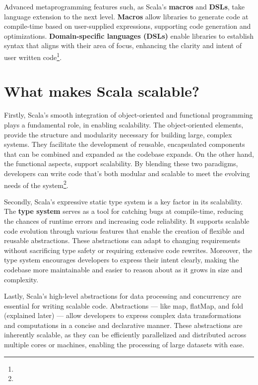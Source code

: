 Advanced metaprogramming features such, as Scala's \textbf{macros} and \textbf{DSLs}, take language extension to the next level. \textbf{Macros} allow libraries to generate code at compile-time based on user-supplied expressions, supporting code generation and optimizations. \textbf{Domain-specific languages (DSLs)} enable libraries to establish syntax that aligns with their area of focus, enhancing the clarity and intent of user written code\footnote[3]{}.

\section{What makes Scala scalable?}

Firstly, Scala's smooth integration of object-oriented and functional programming plays a fundamental role, in enabling scalability. The object-oriented elements, provide the structure and modularity necessary for building large, complex systems. They facilitate the development of reusable, encapsulated components that can be combined and expanded as the codebase expands. On the other hand, the functional aspects, support scalability. By blending these two paradigms, developers can write code that's both modular and scalable to meet the evolving needs of the system\footnote[2]{}.

Secondly, Scala's expressive static type system is a key factor in its scalability. The \textbf{type system} serves as a tool for catching bugs at compile-time, reducing the chances of runtime errors and increasing code reliability. It supports scalable code evolution through various features that enable the creation of flexible and reusable abstractions. These abstractions can adapt to changing requirements without sacrificing type safety or requiring extensive code rewrites. Moreover, the type system encourages developers to express their intent clearly, making the codebase more maintainable and easier to reason about as it grows in size and complexity\footnotemark[2].

Lastly, Scala's high-level abstractions for data processing and concurrency are essential for writing scalable code. Abstractions — like map, flatMap, and fold (explained later) — allow developers to express complex data transformations and computations in a concise and declarative manner. These abstractions are inherently scalable, as they can be efficiently parallelized and distributed across multiple cores or machines, enabling the processing of large datasets with ease\footnotemark[2].

